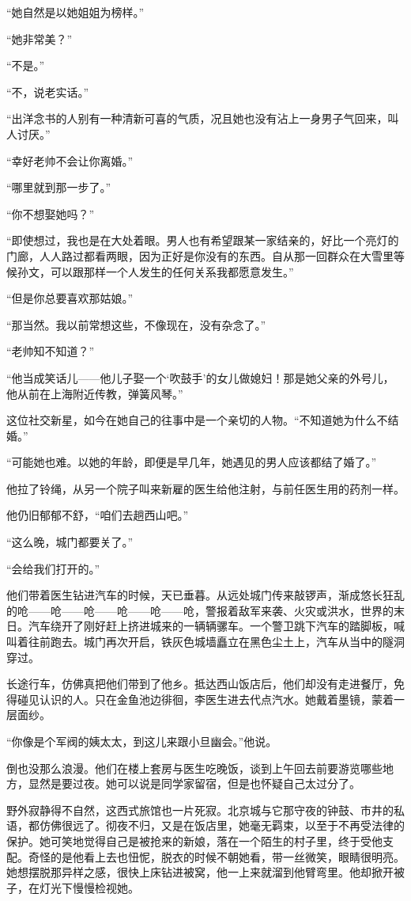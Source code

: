 \par “她自然是以她姐姐为榜样。”
\par “她非常美？”
\par “不是。”
\par “不，说老实话。”
\par “出洋念书的人别有一种清新可喜的气质，况且她也没有沾上一身男子气回来，叫人讨厌。”
\par “幸好老帅不会让你离婚。”
\par “哪里就到那一步了。”
\par “你不想娶她吗？”
\par “即使想过，我也是在大处着眼。男人也有希望跟某一家结亲的，好比一个亮灯的门廊，人人路过都看两眼，因为正好是你没有的东西。自从那一回群众在大雪里等候孙文，可以跟那样一个人发生的任何关系我都愿意发生。”
\par “但是你总要喜欢那姑娘。”
\par “那当然。我以前常想这些，不像现在，没有杂念了。”
\par “老帅知不知道？”
\par “他当成笑话儿——他儿子娶一个‘吹鼓手’的女儿做媳妇！那是她父亲的外号儿，他从前在上海附近传教，弹簧风琴。”
\par 这位社交新星，如今在她自己的往事中是一个亲切的人物。“不知道她为什么不结婚。”
\par “可能她也难。以她的年龄，即便是早几年，她遇见的男人应该都结了婚了。”
\par 他拉了铃绳，从另一个院子叫来新雇的医生给他注射，与前任医生用的药剂一样。
\par 他仍旧郁郁不舒，“咱们去趟西山吧。”
\par “这么晚，城门都要关了。”
\par “会给我们打开的。”
\par 他们带着医生钻进汽车的时候，天已垂暮。从远处城门传来敲锣声，渐成悠长狂乱的呛——呛——呛——呛——呛——呛，警报着敌军来袭、火灾或洪水，世界的末日。汽车绕开了刚好赶上挤进城来的一辆辆骡车。一个警卫跳下汽车的踏脚板，喊叫着往前跑去。城门再次开启，铁灰色城墙矗立在黑色尘土上，汽车从当中的隧洞穿过。
\par 长途行车，仿佛真把他们带到了他乡。抵达西山饭店后，他们却没有走进餐厅，免得碰见认识的人。只在金鱼池边徘徊，李医生进去代点汽水。她戴着墨镜，蒙着一层面纱。
\par “你像是个军阀的姨太太，到这儿来跟小旦幽会。”他说。
\par 倒也没那么浪漫。他们在楼上套房与医生吃晚饭，谈到上午回去前要游览哪些地方，显然是要过夜。她可以说是同学家留宿，但是也怀疑自己太过分了。
\par 野外寂静得不自然，这西式旅馆也一片死寂。北京城与它那守夜的钟鼓、市井的私语，都仿佛很远了。彻夜不归，又是在饭店里，她毫无羁束，以至于不再受法律的保护。她可笑地觉得自己是被抢来的新娘，落在一个陌生的村子里，终于受他支配。奇怪的是他看上去也忸怩，脱衣的时候不朝她看，带一丝微笑，眼睛很明亮。她想摆脱那异样之感，很快上床钻进被窝，他一上来就溜到他臂弯里。他却掀开被子，在灯光下慢慢检视她。
